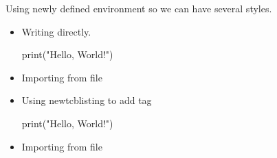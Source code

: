\documentclass[a4paper]{article}
\begin{document}
\noindent Using newly defined environment so we can have several styles.
\begin{itemize}
\item Writing directly.
\begin{pythoncode}
print("Hello, World!")
\end{pythoncode}

\item Importing from file


\item Using newtcblisting to add tag
\begin{pythoncodetag}
print("Hello, World!")
\end{pythoncodetag}

\item Importing from file
\end{itemize}
\end{document}
